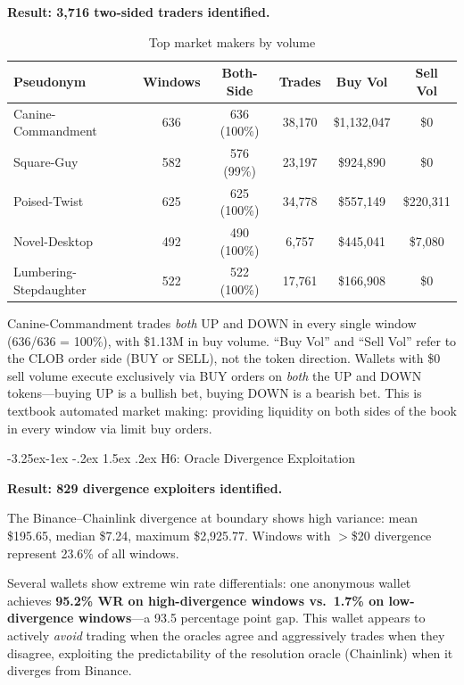 \documentclass[11pt,a4paper]{article}
\makeatletter
\renewcommand\subsection{\@startsection{subsection}{2}{\z@}%
  {-3.25ex\@plus -1ex \@minus -.2ex}%
  {1.5ex \@plus .2ex}%
  {\normalfont\large\bfseries}}
\makeatother
\begin{document}
\textbf{Result: 3,716 two-sided traders identified.}

\begin{table}[H]
\centering
\caption{Top market makers by volume}
\label{tab:mm}
\small
\begin{tabular}{@{}lccccc@{}}
\toprule
\textbf{Pseudonym} & \textbf{Windows} & \textbf{Both-Side} & \textbf{Trades} & \textbf{Buy Vol} & \textbf{Sell Vol} \\
\midrule
Canine-Commandment & 636 & 636 (100\%) & 38,170 & \$1,132,047 & \$0 \\
Square-Guy & 582 & 576 (99\%) & 23,197 & \$924,890 & \$0 \\
Poised-Twist & 625 & 625 (100\%) & 34,778 & \$557,149 & \$220,311 \\
Novel-Desktop & 492 & 490 (100\%) & 6,757 & \$445,041 & \$7,080 \\
Lumbering-Stepdaughter & 522 & 522 (100\%) & 17,761 & \$166,908 & \$0 \\
\bottomrule
\end{tabular}
\end{table}

Canine-Commandment trades \emph{both} UP and DOWN in every single window (636/636 = 100\%), with \$1.13M in buy volume. ``Buy Vol'' and ``Sell Vol'' refer to the CLOB order side (BUY or SELL), not the token direction. Wallets with \$0 sell volume execute exclusively via BUY orders on \emph{both} the UP and DOWN tokens---buying UP is a bullish bet, buying DOWN is a bearish bet. This is textbook automated market making: providing liquidity on both sides of the book in every window via limit buy orders.

\subsection{H6: Oracle Divergence Exploitation}

\textbf{Result: 829 divergence exploiters identified.}

The Binance--Chainlink divergence at boundary shows high variance: mean \$195.65, median \$7.24, maximum \$2,925.77. Windows with $>$\$20 divergence represent 23.6\% of all windows.

Several wallets show extreme win rate differentials: one anonymous wallet achieves \textbf{95.2\% WR on high-divergence windows vs.\ 1.7\% on low-divergence windows}---a 93.5 percentage point gap. This wallet appears to actively \emph{avoid} trading when the oracles agree and aggressively trades when they disagree, exploiting the predictability of the resolution oracle (Chainlink) when it diverges from Binance.
\end{document}

